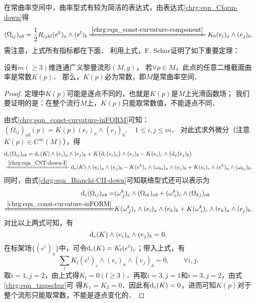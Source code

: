 在常曲率空间中，曲率型式有较为简洁的表达式，由表达式\eqref{chrg:eqn_Cform-down}得
\begin{equation}\label{chrg:eqn_const-curvature-inFORM}
    (\Omega_{ij})_{ab} = \frac{1}{2}R_{ijkl} (e^k)_a \wedge (e^l)_b
    \xlongequal{\ref{chrg:eqn_const-curvature-component}}
    K_0 (e_i)_a \wedge (e_j)_b .
\end{equation}
需注意，上式所有指标都在下面．
利用上式，F. Schur证明了如下重要定理：
\begin{theorem}\label{chrg:thm_Schur-lemma}
    设有$m(\geqslant 3)$维连通广义黎曼流形$(M,g)$，
    若$\forall p\in M$，此点的任意二维截面曲率是常数$K(p)$．
    那么，$K(p)$必为常数，即$M$是常曲率空间．
\end{theorem}
\begin{proof}
    定理中$K(p)$可能是逐点不同的，也就是$K(p)$是$M$上光滑函数场；
    我们要证明的是：在整个流行$M$上，$K(p)$只能取常数值，不能逐点不同．

    由式\eqref{chrg:eqn_const-curvature-inFORM}可知：
    $(\Omega_{ij})_{ab}(p) = K(p) (e_i)_a \wedge (e_j)_b , \quad 1\leqslant i,j \leqslant m$．
    对此式求外微分（注意$K(p)\in C^\infty(M)$），得
    \begin{align*}
        &{\rm d}_c(\Omega_{ij})_{ab} = {\rm d}_c (K)\wedge (e_i)_a \wedge (e_j)_b
        + K \bigl({\rm d}_c(e_i)_a \bigr) \wedge (e_j)_b - K (e_i)_c \wedge \bigl({\rm d}_a (e_j)_b \bigr) \\
        &\xlongequal{\ref{chrg:eqn_CST-down-I}} {\rm d}_c (K)\wedge (e_i)_a \wedge (e_j)_b
        - K (e^k)_c \wedge (\omega_{k i})_a \wedge (e_j)_b
        + K (e_i)_c \wedge (e^k)_a \wedge (\omega_{k j})_b .
    \end{align*}
    同时，由式\eqref{chrg:eqn_Bianchi-CII-down}可知联络型式还可以表示为
    \begin{align*}
      {\rm d}_c (\Omega_{ij})_{ab}  =&  ( \omega _{\cdot j}^k )_c
      \wedge (\Omega_{i k} )_{ab} + ( \omega _{\cdot i}^{k} )_c \wedge (\Omega_{k j})_{ab}   \\
      \xlongequal{\ref{chrg:eqn_const-curvature-inFORM}}&
      K( \omega _{\cdot j}^k )_c \wedge (e_i)_a \wedge (e_k)_b
      +K ( \omega _{\cdot i}^{k} )_c \wedge (e_k)_a \wedge (e_j)_b .
    \end{align*}
    对比以上两式可知，有
    \begin{equation}
        {\rm d}_c (K)\wedge (e_i)_a \wedge (e_j)_b = 0.
    \end{equation}
    在标架场$\{(e^i)_a\}$中，可令${\rm d}_c (K) = K_l (e^l)_c$；带入上式，有
    \begin{equation}\label{chrg:eqn_tmpschur}
       \sum_{l } K_l (e^l)_c \wedge (e_i)_a \wedge (e_j)_b = 0, \qquad \forall i,j .
    \end{equation}
    取$i=1,j=2$，由上式得$K_l=0(l \geqslant 3)$．再取$i=3,j=1$和$i=3,j=2$，由式\eqref{chrg:eqn_tmpschur}可
    得$K_1=K_2=0$．因此有${\rm d}_c (K) = 0$，进而可知$K(p)$对于整个流形只能取常数，不能是逐点变化的．
\end{proof}

